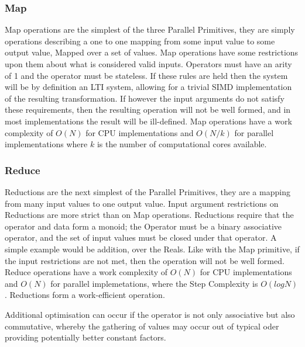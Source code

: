 \subsubsection{Map}

Map operations are the simplest of the three Parallel Primitives, they are simply operations
describing a one to one mapping from some input value to some output value, Mapped over a set of
values. Map operations have some restrictions upon them about what is considered valid inputs.
Operators must have an arity of 1 and the operator must be stateless. If these rules are held then
the system will be by definition an LTI system, allowing for a trivial SIMD implementation of the
resulting transformation. If however the input arguments do not satisfy these requirements, then the
resulting operation will not be well formed, and in most implementations the result will be
ill-defined. Map operations have a work complexity of $ O(N) $ for CPU implementations and $ O(N/k)
$ for parallel implementations where $ k $ is the number of computational cores available.

\FloatBarrier
\subsubsection{Reduce}

Reductions are the next simplest of the Parallel Primitives, they are a mapping from many input
values to one output value. Input argument restrictions on Reductions are more strict than on Map
operations. Reductions require that the operator and data form a monoid; the Operator must be a
binary associative operator, and the set of input values must be closed under that operator. A
simple example would be addition, over the Reals. Like with the Map primitive, if the input
restrictions are not met, then the operation will not be well formed. Reduce operations have a work
complexity of $ O(N) $ for CPU implementations and $ O(N) $ for parallel implemetations, where the
Step Complexity is $ O(log N) $. Reductions form a work-efficient operation.

Additional optimisation can occur if the operator is not only associative but also commutative,
whereby the gathering of values may occur out of typical oder providing potentially better constant
factors.

